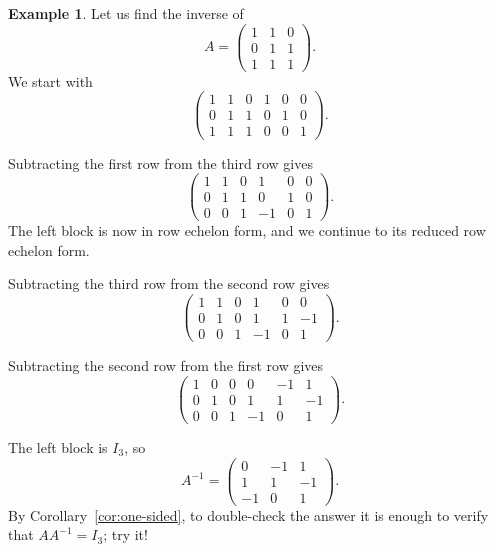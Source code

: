\documentclass[11pt]{article}
\theoremstyle{definition}
\newtheorem{example}[definition]{Example}
\theoremstyle{plain}
\theoremstyle{remark}
\begin{document}
\begin{example}
    Let us find the inverse of
    \[A = \begin{pmatrix}
        1 & 1 & 0 \\
        0 & 1 & 1 \\
        1 & 1 & 1
    \end{pmatrix}.\]
    We start with
    \[\left(\begin{array}{ccc|ccc}
        1 & 1 & 0 & 1 & 0 & 0 \\
        0 & 1 & 1 & 0 & 1 & 0 \\
        1 & 1 & 1 & 0 & 0 & 1
    \end{array}\right).\]

    Subtracting the first row from the third row gives
    \[\left(\begin{array}{ccc|ccc}
        1 & 1 & 0 & 1 & 0 & 0 \\
        0 & 1 & 1 & 0 & 1 & 0 \\
        0 & 0 & 1 & -1 & 0 & 1
    \end{array}\right).\]
    The left block is now in row echelon form, and we continue to its reduced row echelon form.

    Subtracting the third row from the second row gives
    \[\left(\begin{array}{ccc|ccc}
        1 & 1 & 0 & 1 & 0 & 0 \\
        0 & 1 & 0 & 1 & 1 & -1 \\
        0 & 0 & 1 & -1 & 0 & 1
    \end{array}\right).\]

    Subtracting the second row from the first row gives
    \[\left(\begin{array}{ccc|ccc}
        1 & 0 & 0 & 0 & -1 & 1 \\
        0 & 1 & 0 & 1 & 1 & -1 \\
        0 & 0 & 1 & -1 & 0 & 1
    \end{array}\right).\]

    The left block is $I_3$, so
    \[A^{-1} = \begin{pmatrix}
        0 & -1 & 1 \\
        1 & 1 & -1 \\
        -1 & 0 & 1
    \end{pmatrix}.\]
    By Corollary~\ref{cor:one-sided}, to double-check the answer it is enough to verify that $AA^{-1} = I_3$; try it!
\end{example}
\end{document}

